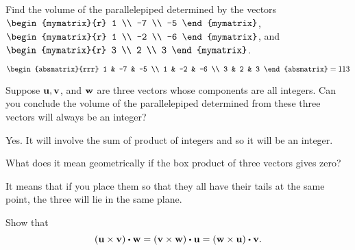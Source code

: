 \begin{enumialphparenastyle}

\begin{ex} Find the volume of the parallelepiped determined by the vectors
$\begin{mymatrix}{r}
1 \\
-7 \\
-5
\end{mymatrix} $, \\
 $\begin{mymatrix}{r}
1 \\
-2 \\
-6
\end{mymatrix}$, and $\begin{mymatrix}{r}
3 \\
2 \\
3
\end{mymatrix}$.
\begin{sol}
 $\begin{absmatrix}{rrr}
1 & -7 & -5 \\
1 & -2 & -6 \\
3 & 2 & 3
\end{absmatrix}= 113$
\end{sol}
\end{ex}

\begin{ex} Suppose $\mbox{\bf u},\mbox{\bf v}$, and $\mbox{\bf w}$ are three vectors whose
components are all integers. Can you conclude the volume of the
parallelepiped determined from these three vectors will always be an integer?
\begin{sol}
Yes. It will involve the sum of product of integers and so it will
be an integer.
\end{sol}
\end{ex}

\begin{ex} \label{exerboxproductzero} What does it mean geometrically if the box
product of three vectors gives zero?
\begin{sol}
It means that if you place them so that
they all have their tails at the same point, the three will lie in the same
plane.
\end{sol}
\end{ex}

\begin{ex} Show that 
  \begin{equation*}
    \tup{\vect{u}\times \vect{v}} \dotprod \vect{w}=
    \tup{\vect{v}\times \vect{w}} \dotprod \vect{u}=
    \tup{\vect{w}\times \vect{u}} \dotprod \vect{v}.
  \end{equation*}
\end{ex}


\end{enumialphparenastyle}
